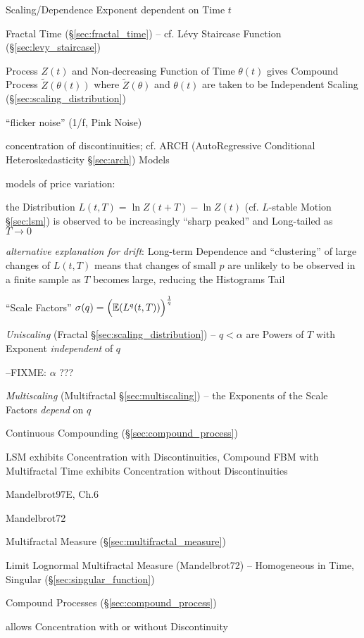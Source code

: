 Scaling/Dependence Exponent dependent on Time $t$

Fractal Time (\S\ref{sec:fractal_time}) -- cf. L\'evy Staircase Function
(\S\ref{sec:levy_staircase})

Process $Z(t)$ and Non-decreasing Function of Time $\theta(t)$ gives Compound
Process $\tilde{Z}(\theta(t))$ where $\tilde{Z}(\theta)$ and $\theta(t)$ are
taken to be Independent Scaling (\S\ref{sec:scaling_distribution})

``flicker noise'' (1/f, Pink Noise)

concentration of discontinuities; cf. ARCH (AutoRegressive Conditional
Heteroskedasticity \S\ref{sec:arch}) Models

models of price variation:

the Distribution $L(t, T) = \ln Z(t + T) - \ln Z(t)$ (cf. $L$-stable Motion
\S\ref{sec:lsm}) is observed to be increasingly ``sharp peaked'' and Long-tailed
as $T \to 0$

\emph{alternative explanation for drift}: Long-term Dependence and
``clustering'' of large changes of $L(t, T)$ means that changes of small $p$ are
unlikely to be observed in a finite sample as $T$ becomes large, reducing the
Histograms Tail

``Scale Factors'' $\sigma(q) = \Big(\mathbb{E}(L^q(t, T))\Big)^{\frac{1}{q}}$

\emph{Uniscaling} (Fractal \S\ref{sec:scaling_distribution}) -- $q < \alpha$ are
Powers of $T$ with Exponent \emph{independent} of $q$

--FIXME: $\alpha$ ???

\emph{Multiscaling} (Multifractal \S\ref{sec:multiscaling}) -- the Exponents of
the Scale Factors \emph{depend} on $q$

Continuous Compounding (\S\ref{sec:compound_process})

LSM exhibits Concentration with Discontinuities, Compound FBM with Multifractal
Time exhibits Concentration without Discontinuities

Mandelbrot97E, Ch.6

Mandelbrot72

Multifractal Measure (\S\ref{sec:multifractal_measure})

Limit Lognormal Multifractal Measure (Mandelbrot72) -- Homogeneous in Time,
Singular (\S\ref{sec:singular_function})

Compound Processes (\S\ref{sec:compound_process})

allows Concentration with or without Discontinuity

